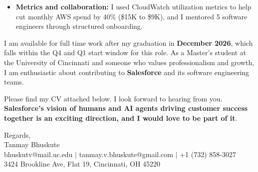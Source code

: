 \documentclass[11pt]{letter}
\begin{document}
\begin{letter}{}
\begin{itemize}[leftmargin=*, itemsep=0.45em]
    \item \textbf{Metrics and collaboration:} I used CloudWatch utilization metrics to help cut monthly AWS spend by 40\% (\$15K to \$9K), and I mentored 5 software engineers through structured onboarding.
\end{itemize}

I am available for full time work after my graduation in \textbf{December 2026}, which falls within the Q4 and Q1 start window for this role. As a Master's student at the University of Cincinnati and someone who values professionalism and growth, I am enthusiastic about contributing to \textbf{Salesforce} and its software engineering teams.

Please find my CV attached below. I look forward to hearing from you. \textbf{Salesforce's vision of humans and AI agents driving customer success together is an exciting direction, and I would love to be part of it}.

{\setlength{\parskip}{0pt}
Regards,\\
Tanmay Bhuskute\\
bhuskutv@mail.uc.edu $\mid$ tanmay.v.bhuskute@gmail.com $\mid$ +1 (732) 858-3027\\
3424 Brookline Ave, Flat 19, Cincinnati, OH 45220
}

\end{letter}
\end{document}
